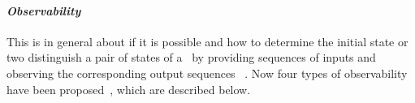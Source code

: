 \paragraph*{\em Observability} This is in general about if it is possible and how to determine the initial state or two distinguish a pair of states of a \BCN\   by providing sequences of inputs and observing the corresponding output sequences ~\cite{cheng2009controllability}. Now four types of observability have been proposed~\cite{Zhang2016Observability}, which are described below.


